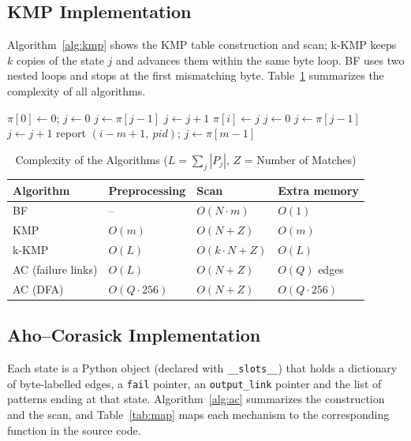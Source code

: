 \documentclass[conference]{IEEEtran}
\begin{document}
\subsection{KMP Implementation}
Algorithm~\ref{alg:kmp} shows the KMP table construction and scan; k-KMP keeps $k$ copies of the state $j$ and advances them within the same byte loop. BF uses two nested loops and stops at the first mismatching byte. Table~\ref{tab:cx} summarizes the complexity of all algorithms.

\begin{algorithm}[t]
\caption{KMP table construction and scan}
\label{alg:kmp}
\begin{algorithmic}[1]
\State $\pi[0]\gets 0$; $j\gets 0$
   \State $j\gets\pi[j-1]$ \EndWhile
   \State $j\gets j+1$ \EndIf
  \State $\pi[i]\gets j$
\EndFor
\State $j\gets 0$
   \State $j\gets\pi[j-1]$ \EndWhile
   \State $j\gets j+1$ \EndIf
   \State report $(i-m+1,\ pid)$; $j\gets\pi[m-1]$ \EndIf
\EndFor
\end{algorithmic}
\end{algorithm}

\begin{table}[t]
\caption{Complexity of the Algorithms ($L=\sum_j|P_j|$, $Z$ = Number of Matches)}
\label{tab:cx}
\centering
\begin{tabular}{@{}llll@{}}
\toprule
Algorithm & Preprocessing & Scan & Extra memory \\
\midrule
BF & -- & $O(N\cdot m)$ & $O(1)$ \\
KMP & $O(m)$ & $O(N+Z)$ & $O(m)$ \\
k-KMP & $O(L)$ & $O(k\cdot N+Z)$ & $O(L)$ \\
AC (failure links) & $O(L)$ & $O(N+Z)$ & $O(Q)$ edges \\
AC (DFA) & $O(Q\cdot 256)$ & $O(N+Z)$ & $O(Q\cdot 256)$ \\
\bottomrule
\end{tabular}
\end{table}

\subsection{Aho--Corasick Implementation}
Each state is a Python object (declared with \texttt{\_\_slots\_\_}) that holds a dictionary of byte-labelled edges, a \texttt{fail} pointer, an \texttt{output\_link} pointer and the list of patterns ending at that state. Algorithm~\ref{alg:ac} summarizes the construction and the scan, and Table~\ref{tab:map} maps each mechanism to the corresponding function in the source code.
\end{document}
